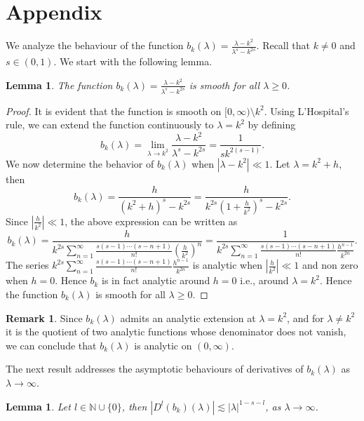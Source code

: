 \documentclass[12pt]{amsart}
\numberwithin{equation}{section}
\newtheorem{lem}[thm]{Lemma}
\theoremstyle{definition}
\newtheorem{rem}[thm]{Remark}
\theoremstyle{remark}
\numberwithin{equation}{section}
\begin{document}
	\section{Appendix}
	We analyze the behaviour of the function $\displaystyle{b_k(\lambda)=\frac{\lambda-k^2}{\lambda^s-k^{2s}}}$. Recall that $k\neq 0$ and $s\in(0,1)$. We start with the following lemma.
	\begin{lem}\label{smoothness of bk}
		The function $\displaystyle{b_k(\lambda)=\frac{\lambda-k^2}{\lambda^s-k^{2s}}}$ is smooth for all $\lambda\geq 0$.
	\end{lem}
	\begin{proof}
		It is evident that the function is smooth on $[0,\infty)\setminus{k^2}$. Using L'Hospital's rule, we can extend the function continuously to $\lambda = k^2$ by defining
		\[
		b_k(\lambda)=\lim_{\lambda\to k^2}\frac{\lambda-k^2}{\lambda^s-k^{2s}}
		=\frac{1}{sk^{2(s-1)}}.
		\]
		We now determine the behavior of $b_k(\lambda)$ when $|\lambda-k^2|\ll 1$. Let $\lambda=k^2+h$, then
		\[
		b_k(\lambda)=\frac{h}{(k^2+h)^s-k^{2s}}= \frac{h}{k^{2s}(1+\frac{h}{k^2})^s-k^{2s}}.
		\]
		Since $\displaystyle{\left|\frac{h}{k^2}\right|\ll 1}$, the above expression can be written as
		\[
		b_k(\lambda)=\frac{h}{k^{2s}\sum\limits_{n=1}^{\infty} \frac{s(s-1)\cdots(s-n+1)}{n!}\left(\frac{h}{k^2}\right)^n}= \frac{1}{k^{2s}\sum\limits_{n=1}^{\infty} \frac{s(s-1)\cdots(s-n+1)}{n!}\frac{h^{n-1}}{k^{2n}}}.
		\]
		The series $\displaystyle{k^{2s}\sum\limits_{n=1}^{\infty} \frac{s(s-1)\cdots(s-n+1)}{n!}\frac{h^{n-1}}{k^{2n}}}$ is analytic when $\displaystyle{\left| \frac{h}{k^2}\right|\ll 1}$ and non zero when $h=0$. Hence $b_k$ is in fact analytic around $h=0$ i.e., around $\lambda=k^2$. Hence the function $b_k(\lambda)$ is smooth for all $\lambda\geq 0$.
	\end{proof}
	\begin{rem}\label{analyticity of bk}
		Since \(b_k(\lambda)\) admits an analytic extension at \(\lambda = k^2\), and for \(\lambda \neq k^2\) it is the quotient of two analytic functions whose denominator does not vanish, we can conclude that \(b_k(\lambda)\) is analytic on $(0,\infty)$.
	\end{rem}
	The next result addresses the asymptotic behaviours of derivatives of $b_k(\lambda)$ as $\lambda\to \infty$.
	\begin{lem}\label{decay of derivatives}
		Let $l\in\mathbb{N}\cup\{0\}$, then $\displaystyle{\left|D^l(b_k)(\lambda)\right|\lesssim |\lambda|^{1-s-l}}$, as $\lambda\to\infty$.
	\end{lem}
\end{document}
